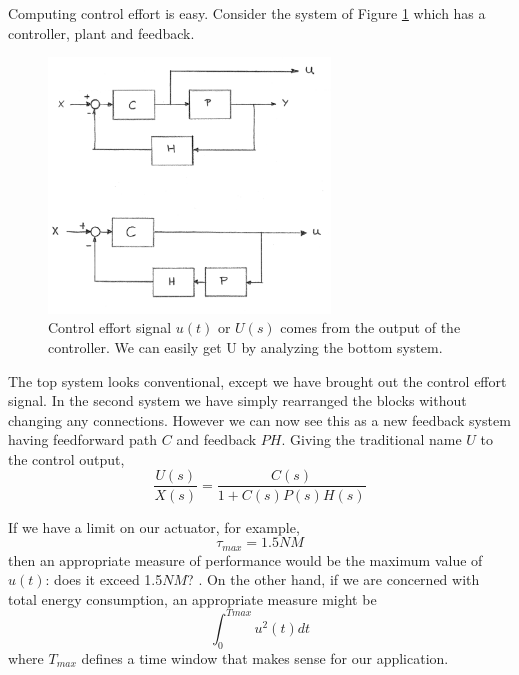 Computing control effort is easy.  Consider the system of Figure \ref{controleffort}  which has a controller, plant and feedback.	%






\begin{figure}\centering
\includegraphics[width=75mm]{figs11/00650a.png}
\caption{Control effort signal $u(t)$ or $U(s)$ comes from the output of the controller. We can easily get U by analyzing the bottom system.}\label{controleffort}
\end{figure}






The top system looks conventional, except we have brought out the control effort signal.   In the second system we have simply rearranged the blocks without changing any connections.   However we can now see this as a new feedback system having feedforward path $C$ and feedback $PH$.  Giving the traditional name  $U$ to the control output,	%
\[
\frac{U(s)}{X(s)} = \frac {C(s)}  {1+C(s)P(s)H(s)}
\]



If we have a limit on our actuator, for example,	%
\[
\tau_{max} = 1.5 NM
\]
then an appropriate measure of performance would be the maximum value of $u(t)$: does it exceed 1.5$NM$? .   On the other hand, if we are concerned with total energy consumption, an appropriate measure might be	%
\[
\int_0^{Tmax} u^2(t) dt
\]
where $T_{max}$ defines a time window that makes sense for our application.	%

